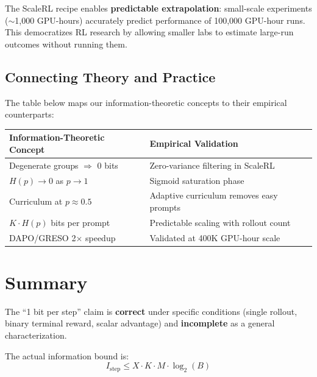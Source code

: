 \documentclass[11pt,a4paper]{article}
\theoremstyle{definition}
\theoremstyle{remark}
\begin{document}
\begin{keyresult}
The ScaleRL recipe enables \textbf{predictable extrapolation}: small-scale experiments ($\sim$1,000 GPU-hours) accurately predict performance of 100,000 GPU-hour runs. This democratizes RL research by allowing smaller labs to estimate large-run outcomes without running them.
\end{keyresult}

\subsection{Connecting Theory and Practice}

The table below maps our information-theoretic concepts to their empirical counterparts:

\begin{center}
\begin{tabular}{@{}p{5.5cm}p{6cm}@{}}
\toprule
\textbf{Information-Theoretic Concept} & \textbf{Empirical Validation} \\
\midrule
Degenerate groups $\Rightarrow$ 0 bits & Zero-variance filtering in ScaleRL \\
$H(p) \to 0$ as $p \to 1$ & Sigmoid saturation phase \\
Curriculum at $p \approx 0.5$ & Adaptive curriculum removes easy prompts \\
$K \cdot H(p)$ bits per prompt & Predictable scaling with rollout count \\
DAPO/GRESO 2$\times$ speedup & Validated at 400K GPU-hour scale \\
\bottomrule
\end{tabular}
\end{center}

\section{Summary}

The ``1 bit per step'' claim is \textbf{correct} under specific conditions (single rollout, binary terminal reward, scalar advantage) and \textbf{incomplete} as a general characterization.

The actual information bound is:
\[
I_{\text{step}} \leq X \cdot K \cdot M \cdot \log_2(B)
\]
\end{document}
